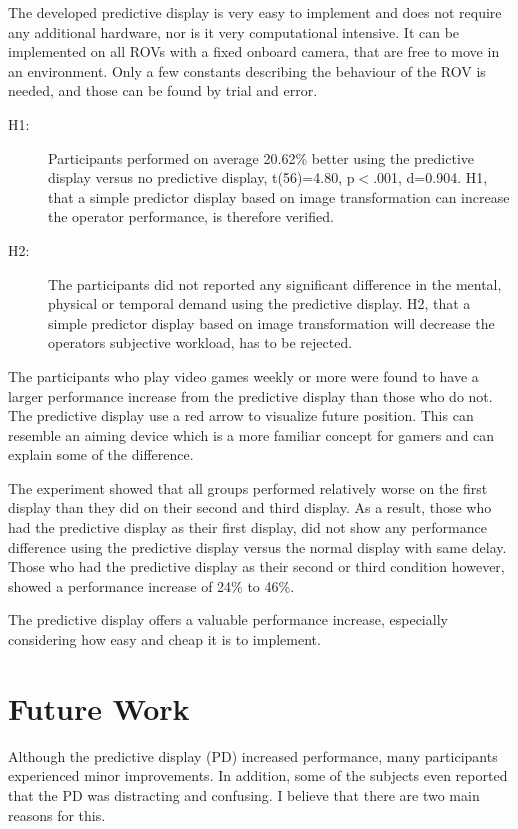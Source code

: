 The developed predictive display is very easy to implement and does not require any additional hardware, nor is it very computational intensive. It can be implemented on all ROVs with a fixed onboard camera, that are free to move in an environment. Only a few constants describing the behaviour of the ROV is needed, and those can be found by trial and error.

\begin{description}
\item[H1:] Participants performed on average 20.62\% better using the predictive display versus no predictive display, t(56)=4.80, p$<$.001, d=0.904. H1, that a simple predictor display based on image transformation can increase the operator performance, is therefore verified.

\item[H2:] The participants did not reported any significant difference in the mental, physical or temporal demand using the predictive display. H2, that a simple predictor display based on image transformation will decrease the operators subjective workload, has to be rejected. 
\end{description}

The participants who play video games weekly or more were found to have a larger performance increase from the predictive display than those who do not. The predictive display use a red arrow to visualize future position. This can resemble an aiming device which is a more familiar concept for gamers and can explain some of the difference.

The experiment showed that all groups performed relatively worse on the first display than they did on their second and third display. As a result, those who had the predictive display as their first display, did not show any performance difference using the predictive display versus the normal display with same delay. Those who had the predictive display as their second or third condition however, showed a performance increase of 24\% to 46\%.

The predictive display offers a valuable performance increase, especially considering how easy and cheap it is to implement.

\section{Future Work}

Although the predictive display (PD) increased performance, many participants experienced minor improvements. In addition, some of the subjects even reported that the PD was distracting and confusing. I believe that there are two main reasons for this.

